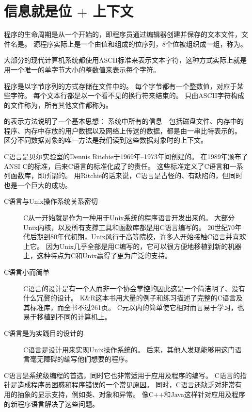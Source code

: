 \section{信息就是位 $+$ 上下文}
{
    程序的生命周期是从一个开始的，即程序员通过编辑器创建并保存的文本文件，文件名是。
    源程序实际上是一个由值和组成的位序列，8个位被组织成一组，称为。

    大部分的现代计算机系统都使用ASCII标准来表示文本字符，这种方式实际上就是用一个唯一的单字节大小的整数值来表示每个字符。

    程序是以字节序列的方式存储在文件中的。
    每个字节都有一个整数值，对应于某些字符。
    每个文本行都是以一个看不见的换行符来结束的。
    只由ASCII字符构成的文件称为，所有其他文件都称为。

    的表示方法说明了一个基本思想：
    系统中所有的信息---包括磁盘文件、内存中的程序、内存中存放的用户数据以及网络上传送的数据，都是由一串比特表示的。
    区分不同数据对象的唯一方法是我们读到这些数据对象时的上下文。

    \begin{sidenote}[C编程语言的起源]
        C语言是贝尔实验室的Dennis Ritchie于1969年--1973年间创建的。
        在1989年颁布了ANSI C的标准，后来C语言的标准化成了的责任。
        这些标准定义了C语言和一系列函数库，即所谓的。
        用Ritchie的话来说，C语言是古怪的、有缺陷的，但同时也是一个巨大的成功。
    
        \begin{description}
            \item[C语言与Unix操作系统关系密切]
            {
                C从一开始就是作为一种用于Unix系统的程序语言开发出来的。
                大部分Unix内核，以及所有支撑工具和函数库都是用C语言编写的。
                20世纪70年代后期到80年代初期，Unix风行于高等院校，许多人开始接触C语言并喜欢上它。
                因为Unix几乎全部是用C编写的，它可以很方便地移植到新的机器上，这种特点为C和Unix赢得了更为广泛的支持。
            }
            \item[C语言小而简单]
            {
                C语言的设计是有一个人而非一个协会掌控的因此这是一个简洁明了、没有什么冗赘的设计。
                K\&R这本书用大量的例子和练习描述了完整的C语言及其标准库，而全书不过261页。
                C元以内的简单使它相对而言易于学习，也易于移植到不同的计算机上。
            }
            \item[C语言是为实践目的设计的]
            {
                C语言是设计用来实现Unix操作系统的。
                后来，其他人发现能够用这门语言毫无障碍的编写他们想要的程序。
            }
        \end{description}
    
        C语言是系统级编程的首选，同时它也非常适用于应用及程序的编写。
        C语言的指针是造成程序员困惑和程序错误的一个常见原因。
        同时，C语言还缺乏对非常有用的抽象的显示支持，例如类、对象和异常。
        像C++和Java这样针对应用及程序的新程序语言解决了这些问题。
    \end{sidenote}
}

\endinput
